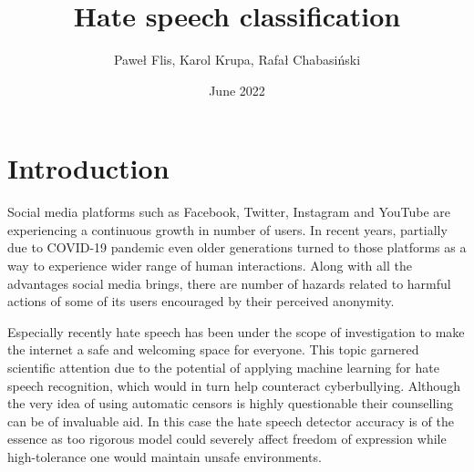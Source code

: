 \documentclass[a4paper]{article}
\title{Hate speech classification}
\author{Paweł Flis, Karol Krupa, Rafał Chabasiński}
\date{June 2022}
\begin{document}
\maketitle

\section{Introduction}
Social media platforms such as Facebook, Twitter, Instagram and YouTube are experiencing a continuous growth in number of users. In recent years, partially due to COVID-19 pandemic even older generations turned to those platforms as a way to experience wider range of human interactions. Along with all the advantages social media brings, there are number of hazards related to harmful actions of some of its users encouraged by their perceived anonymity.
\par
Especially recently hate speech has been under the scope of investigation to make the internet a safe and welcoming space for everyone. This topic garnered scientific attention due to the potential of applying machine learning for hate speech recognition, which would in turn help counteract cyberbullying. Although the very idea of using automatic censors is highly questionable their counselling can be of invaluable aid. In this case the hate speech detector accuracy is of the essence as too rigorous model could severely affect freedom of expression while high-tolerance one would maintain unsafe environments.
\end{document}
